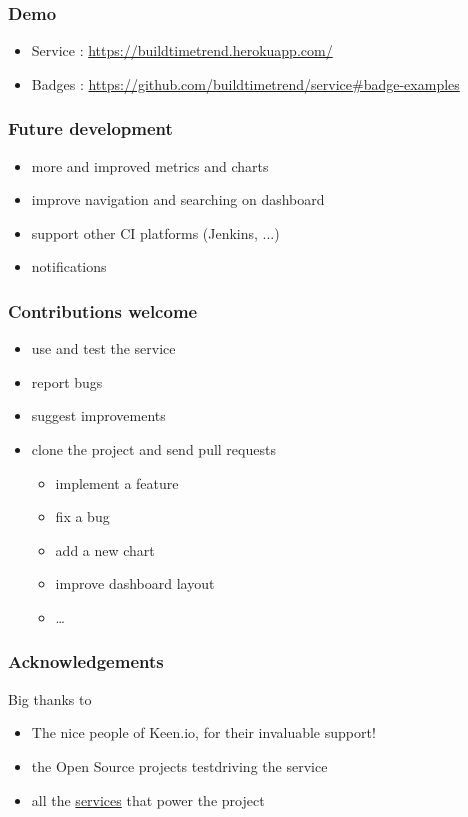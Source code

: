 \documentclass[14pt]{beamer}
\begin{document}
  \begin{frame}
    \frametitle{Demo}
    \begin{itemize}
      \item Service : \href{https://buildtimetrend.herokuapp.com/}{\small{https://buildtimetrend.herokuapp.com/}}
      \item Badges : \href{https://github.com/buildtimetrend/service\#badge-examples}{\small{https://github.com/buildtimetrend/service\#badge-examples}}
    \end{itemize}
  \end{frame}
  \begin{frame}
    \frametitle{Future development}
    \begin{itemize}
      \item more and improved metrics and charts
      \item improve navigation and searching on dashboard
      \item support other CI platforms (Jenkins, ...)
      \item notifications
    \end{itemize}
  \end{frame}
  \begin{frame}
    \frametitle{Contributions welcome}
    \begin{itemize}
      \item use and test the service
      \item report bugs
      \item suggest improvements
      \item clone the project and send pull requests
      \begin{itemize}
        \item implement a feature
        \item fix a bug
        \item add a new chart
        \item improve dashboard layout
        \item \ldots
      \end{itemize}
    \end{itemize}
  \end{frame}
  \begin{frame}
    \frametitle{Acknowledgements}
    Big thanks to
    \begin{itemize}
      \item The nice people of Keen.io, for their invaluable support!
      \item the Open Source projects testdriving the service
      \item all the \href{https://github.com/buildtimetrend/python-lib/wiki/Credits}{services} that power the project
    \end{itemize}
  \end{frame}
\end{document}
